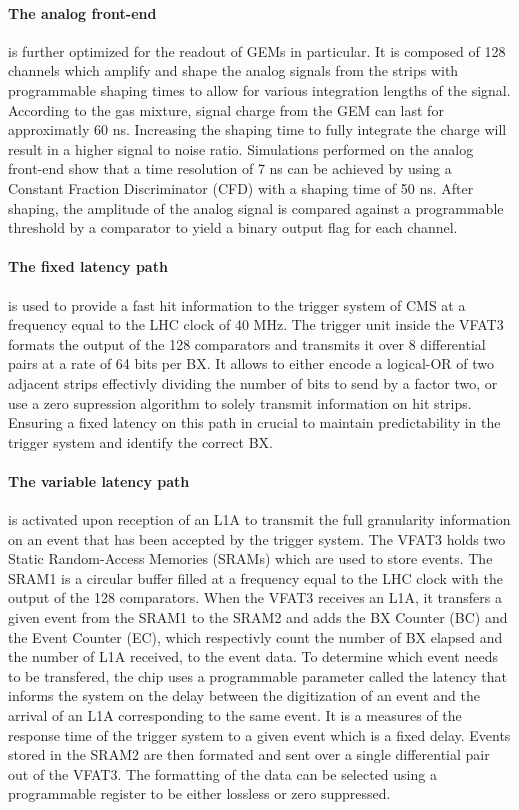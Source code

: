      \paragraph{The analog front-end} is further optimized for the readout of GEMs in particular. It is composed of 128 channels which amplify and shape the analog signals from the strips with programmable shaping times to allow for various integration lengths of the signal. According to the gas mixture, signal charge from the GEM can last for approximatly 60 ns. Increasing the shaping time to fully integrate the charge will result in a higher signal to noise ratio. Simulations performed on the analog front-end show that a time resolution of 7 ns can be achieved by using a Constant Fraction Discriminator (CFD) with a shaping time of 50 ns. After shaping, the amplitude of the analog signal is compared against a programmable threshold by a comparator to yield a binary output flag for each channel. \\

      \paragraph{The fixed latency path} is used to provide a fast hit information to the trigger system of CMS at a frequency equal to the LHC clock of 40 MHz. The trigger unit inside the VFAT3 formats the output of the 128 comparators and transmits it over 8 differential pairs at a rate of 64 bits per BX. It allows to either encode a logical-OR of two adjacent strips effectivly dividing the number of bits to send by a factor two, or use a zero supression algorithm to solely transmit information on hit strips. Ensuring a fixed latency on this path in crucial to maintain predictability in the trigger system and identify the correct BX. \\

      \paragraph{The variable latency path} is activated upon reception of an L1A to transmit the full granularity information on an event that has been accepted by the trigger system. The VFAT3 holds two Static Random-Access Memories (SRAMs) which are used to store events. The SRAM1 is a circular buffer filled at a frequency equal to the LHC clock with the output of the 128 comparators. When the VFAT3 receives an L1A, it transfers a given event from the SRAM1 to the SRAM2 and adds the BX Counter (BC) and the Event Counter (EC), which respectivly count the number of BX elapsed and the number of L1A received, to the event data. To determine which event needs to be transfered, the chip uses a programmable parameter called the latency that informs the system on the delay between the digitization of an event and the arrival of an L1A corresponding to the same event. It is a measures of the response time of the trigger system to a given event which is a fixed delay. Events stored in the SRAM2 are then formated and sent over a single differential pair out of the VFAT3. The formatting of the data can be selected using a programmable register to be either lossless or zero suppressed. \\

